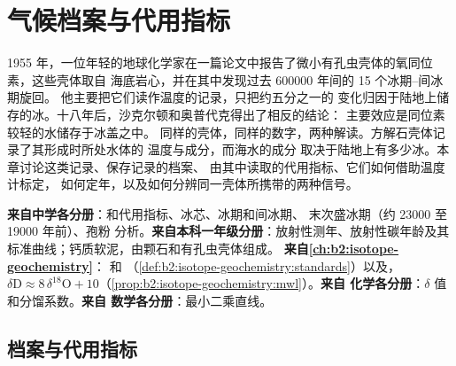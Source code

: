 \chapter{气候档案与代用指标}\label{ch:b2:climate-proxies}

1955 年，一位年轻的地球化学家在一篇论文中报告了微小有孔虫壳体的氧同位素，这些壳体取自
海底岩心，并在其中发现过去 \num{600000} 年间的 15 个冰期–间冰期旋回。
他主要把它们读作温度的记录，只把约五分之一的
变化归因于陆地上储存的冰。十八年后，沙克尔顿和奥普代克得出了相反的结论：
主要效应是同位素较轻的水储存于冰盖之中。
同样的壳体，同样的数字，两种解读。方解石壳体记录了其形成时所处水体的
温度与成分，而海水的成分
取决于陆地上有多少冰。本章讨论这类记录、保存记录的档案、
由其中读取的代用指标、它们如何借助温度计标定，
如何定年，以及如何分辨同一壳体所携带的两种信号。

\begin{recall}
\textbf{来自中学各分册}：和代用指标、冰芯、冰期和间冰期、
末次盛冰期（约 \num{23000} 至 \num{19000} 年前）、孢粉
分析。\textbf{来自本科一年级分册}：放射性测年、放射性碳年龄及其
标准曲线；钙质软泥，由颗石和有孔虫壳体组成。
\textbf{来自\cref{ch:b2:isotope-geochemistry}}：  和 
（\cref{def:b2:isotope-geochemistry:standards}）以及，$\delta\mathrm{D}
\approx 8\,\delta^{18}\mathrm{O} + 10$（\cref{prop:b2:isotope-geochemistry:mwl}）。\textbf{来自
化学各分册}：$\delta$ 值和分馏系数。\textbf{来自
数学各分册}：最小二乘直线。
\end{recall}

\section{档案与代用指标}\label{sec:b2:climate-proxies:archives}

